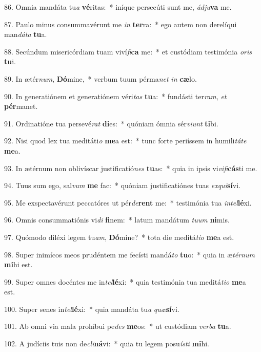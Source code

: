 86. Omnia mandáta tu\textit{a} \textbf{vé}ritas:~*  iníque persecúti sunt me, \textit{ád}\textit{ju}\textbf{va} me.\

87. Paulo minus consummavérunt me \textit{in} \textbf{ter}ra:~*  ego autem non derelíqui man\textit{dá}\textit{ta} \textbf{tu}a.\

88. Secúndum misericórdiam tuam viví\textit{fi}\textbf{ca} me:~*  et custódiam testimónia \textit{o}\textit{ris} \textbf{tu}i.\

89. In ætér\textit{num}, \textbf{Dó}mine,~*  verbum tuum pérma\textit{net} \textit{in} \textbf{cæ}lo.\

90. In generatiónem et generatiónem véri\textit{tas} \textbf{tu}a:~*  fundásti ter\textit{ram}, \textit{et} \textbf{pér}manet.\

91. Ordinatióne tua persevé\textit{rat} \textbf{di}es:~*  quóniam ómnia sér\textit{vi}\textit{unt} \textbf{ti}bi.\

92. Nisi quod lex tua meditáti\textit{o} \textbf{me}a est:~*  tunc forte periíssem in humili\textit{tá}\textit{te} \textbf{me}a.\

93. In ætérnum non oblivíscar justificatió\textit{nes} \textbf{tu}as:~*  quia in ipsis vi\textit{vi}\textit{fi}\textbf{cás}ti me.\

94. Tuus sum ego, sal\textit{vum} \textbf{me} fac:~*  quóniam justificatiónes tuas \textit{ex}\textit{qui}\textbf{sí}vi.\

95. Me exspectavérunt peccatóres ut pér\textit{de}\textbf{rent} me:~*  testimónia tua \textit{in}\textit{tel}\textbf{lé}xi.\

96. Omnis consummatiónis vi\textit{di} \textbf{fi}nem:~*  latum mandátum \textit{tu}\textit{um} \textbf{ni}mis.\

97. Quómodo diléxi legem tu\textit{am}, \textbf{Dó}mine?~*  tota die meditá\textit{ti}\textit{o} \textbf{me}a est.\

98. Super inimícos meos prudéntem me fecísti mandá\textit{to} \textbf{tu}o:~*  quia in æ\textit{tér}\textit{num} \textbf{mi}hi est.\

99. Super omnes docéntes me in\textit{tel}\textbf{lé}xi:~*  quia testimónia tua meditá\textit{ti}\textit{o} \textbf{me}a est.\

100. Super senes in\textit{tel}\textbf{lé}xi:~*  quia mandáta tu\textit{a} \textit{quæ}\textbf{sí}vi.\

101. Ab omni via mala prohíbui pe\textit{des} \textbf{me}os:~*  ut custódiam \textit{ver}\textit{ba} \textbf{tu}a.\

102. A judíciis tuis non de\textit{cli}\textbf{ná}vi:~*  quia tu legem posu\textit{ís}\textit{ti} \textbf{mi}hi.\

